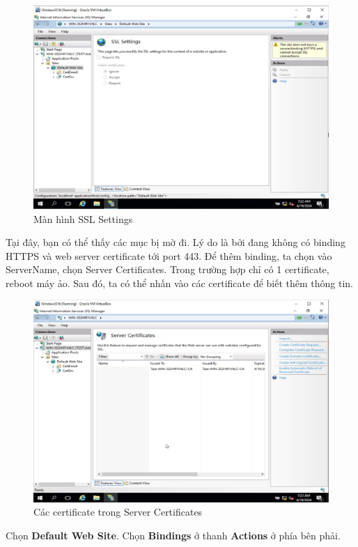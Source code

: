 \begin{figure}[!htb]
    \centering
    \includegraphics[width=0.8\linewidth]{figure//chapter4//lab4_2/ssl_settings.png}
    \caption{Màn hình SSL Settings}
    \label{fig:enter-label}
\end{figure}

\noindent Tại đây, bạn có thể thấy các mục bị mờ đi. Lý do là bởi đang không có binding HTTPS và web server certificate tới port 443. Để thêm binding, ta chọn vào ServerName, chọn Server Certificates. Trong trường hợp chỉ có 1 certificate, reboot máy ảo. Sau đó, ta có thể nhấn vào các certificate để biết thêm thông tin.

\begin{figure}[!htb]
    \centering
    \includegraphics[width=0.8\linewidth]{figure//chapter4//lab4_2/ser_cert.png}
    \caption{Các certificate trong Server Certificates}
    \label{fig:enter-label}
\end{figure}

\newpage

 Chọn \textbf{Default Web Site}. Chọn \textbf{Bindings} ở thanh \textbf{Actions} ở phía bên phải.

